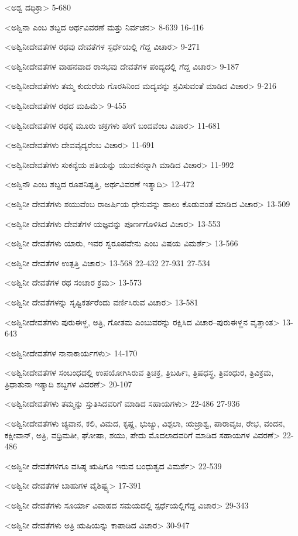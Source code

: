 <ಅಶ್ವ ದಧಿಕ್ರಾ>
5-680

<ಅಶ್ವಿನಾ ಎಂಬ ಶಬ್ದದ ಅರ್ಥವಿವರಣೆ ಮತ್ತು ನಿರ್ವಚನ>
8-639
16-416

<ಅಶ್ವಿನೀದೇವತೆಗಳ ರಥವು ದೇವತೆಗಳ ಸ್ಪರ್ಧೆಯಲ್ಲಿ ಗೆದ್ದ ವಿಚಾರ>
9-271

<ಅಶ್ವಿನೀದೇವತೆಗಳ ವಾಹನವಾದ ರಾಸಭವು ದೇವತೆಗಳ ಪಂದ್ಯದಲ್ಲಿ ಗೆದ್ದ ವಿಚಾರ>
9-187

<ಅಶ್ವಿನೀದೇವತೆಗಳು ತಮ್ಮ ಕುದುರೆಯ ಗೊರಸಿನಿಂದ ಮದ್ಯವನ್ನು ಸ್ರವಿಸುವಂತೆ ಮಾಡಿದ ವಿಚಾರ>
9-216

<ಅಶ್ವಿನೀದೇವತೆಗಳ ರಥದ ಮಹಿಮೆ>
9-455

<ಅಶ್ವಿನೀದೇವತೆಗಳ ರಥಕ್ಕೆ ಮೂರು ಚಕ್ರಗಳು ಹೇಗೆ ಬಂದವೆಂಬ ವಿಚಾರ>
11-681

<ಅಶ್ವಿನೀದೇವತೆಗಳು ದೇವವೈದ್ಯರೆಂಬ ವಿಚಾರ>
11-691

<ಅಶ್ವಿನೀದೇವತೆಗಳು ಸುಕನ್ಯೆಯ ಪತಿಯನ್ನು ಯುವಕನನ್ನಾಗಿ ಮಾಡಿದ ವಿಚಾರ>
11-992

<ಅಶ್ವಿನೌ ಎಂಬ ಶಬ್ದದ ರೂಪನಿಷ್ಪತ್ತಿ, ಅರ್ಥವಿವರಣೆ ಇತ್ಯಾದಿ>
12-472

<ಅಶ್ವಿನೀ ದೇವತೆಗಳು ಶಯುವೆಂಬ ರಾಜರ್ಷಿಯ ಧೇನುವನ್ನು ಹಾಲು ಕೊಡುವಂತೆ ಮಾಡಿದ ವಿಚಾರ>
13-509

<ಅಶ್ವಿನೀ ದೇವತೆಗಳು ದೇವತೆಗಳ ಯಜ್ಞವನ್ನು ಪೂರ್ಣಗೊಳಿಸಿದ ವಿಚಾರ>
13-553

<ಅಶ್ವಿನೀ ದೇವತೆಗಳು ಯಾರು, ಇವರ ಸ್ವರೂಪವೇನು ಎಂಬ ವಿಷಯ ವಿಮರ್ಶೆ>
13-566

<ಅಶ್ವಿನೀ ದೇವತೆಗಳ ಉತ್ಪತ್ತಿ ವಿಚಾರ>
13-568
22-432
27-931
27-534

<ಅಶ್ವಿನೀ ದೇವತೆಗಳ ರಥ ಸಂಚಾರ ಕ್ರಮ>
13-573

<ಅಶ್ವಿನೀ ದೇವತೆಗಳನ್ನು ಸೃಷ್ಟಿಕರ್ತರೆಂದು ವರ್ಣಿಸಿರುವ ವಿಚಾರ>
13-581

<ಅಶ್ವಿನೀದೇವತೆಗಳು ಪುರುಈಳ್ಹ, ಅತ್ರಿ, ಗೋತಮ ಎಂಬುವರನ್ನು ರಕ್ಷಿಸಿದ ವಿಚಾರ–ಪುರುಈಳ್ಹನ ವೃತ್ತಾಂತ>
13-643

<ಅಶ್ವಿನೀದೇವತೆಗಳ ನಾನಾಕಾರ್ಯಗಳು>
14-170

<ಅಶ್ವಿನೀದೇವತೆಗಳ ಸಂಬಂಧದಲ್ಲಿ ಉಪಯೋಗಿಸಿರುವ ತ್ರಿಚಕ್ರ, ತ್ರಿಬರ್ಹಿಃ, ತ್ರಿಷಧಸ್ಥ, ತ್ರಿವಂಧುರ, ತ್ರಿವಿಕ್ರಮ, ತ್ರಿಧಾತುನಾ ಇತ್ಯಾದಿ ಶಬ್ದಗಳ ವಿವರಣೆ>
20-107

<ಅಶ್ವಿನೀದೇವತೆಗಳು ತಮ್ಮನ್ನು ಸ್ತುತಿಸಿದವರಿಗೆ ಮಾಡಿದ ಸಹಾಯಗಳು>
22-486
27-936

<ಅಶ್ವಿನೀದೇವತೆಗಳು ಚ್ಯವಾನ, ಕಲಿ, ವಿಮದ, ಕೃಷ್ಣ, ಭುಜ್ಯು, ವಿಶ್ಪಲಾ, ಋಜ್ರಾಶ್ವ, ಪಾರಾವೃಜ, ರೇಭ, ವಂದನ, ಕಕ್ಷೀವಾನ್‍, ಅತ್ರಿ, ವಧ್ರಿಮತೀ, ಘೋಷಾ, ಶಯು, ಪೇದು ಮೊದಲಾದವರಿಗೆ ಮಾಡಿದ ಸಹಾಯಗಳ ವಿವರಣೆ>
22-486

<ಅಶ್ವಿನೀ ದೇವತೆಗಳಿಗೂ ವಸಿಷ್ಠ ಋಷಿಗೂ ಇರುವ ಬಂಧುತ್ವದ ವಿಮರ್ಶೆ>
22-539

<ಅಶ್ವಿನೀ ದೇವತೆಗಳ ಬಾಹುಗಳ ವೈಶಿಷ್ಟ್ಯ>
17-391

<ಅಶ್ವಿನೀ ದೇವತೆಗಳು ಸೂರ್ಯಾ ವಿವಾಹದ ಸಮಯದಲ್ಲಿ ಸ್ಪರ್ಧೆಯಲ್ಲಿಗೆದ್ದ ವಿಚಾರ>
29-343

<ಅಶ್ವಿನೀ ದೇವತೆಗಳು ಅತ್ರಿ ಋಷಿಯನ್ನು ಕಾಪಾಡಿದ ವಿಚಾರ>
30-947

